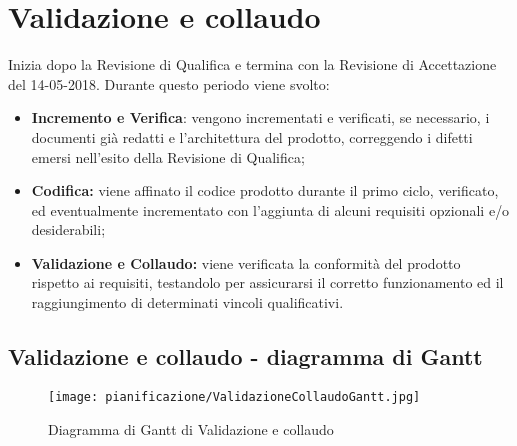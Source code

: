 \documentclass[../PianodiProgetto.tex]{subfiles}
\begin{document}
	\section{Validazione e collaudo}
	Inizia dopo la Revisione di Qualifica e termina con la Revisione di Accettazione del 14-05-2018. Durante questo periodo viene svolto:
	\begin{itemize}
		\item \textbf{Incremento e Verifica}: vengono incrementati e verificati, se necessario, i documenti già redatti e l'architettura del prodotto, correggendo i difetti emersi nell'esito della Revisione di Qualifica;
		\item \textbf{Codifica:} viene affinato il codice prodotto durante il primo ciclo, verificato, ed eventualmente incrementato con l'aggiunta di alcuni requisiti opzionali e/o desiderabili;		
		\item \textbf{Validazione e Collaudo:} viene verificata la conformità del prodotto rispetto ai requisiti, testandolo per assicurarsi il corretto funzionamento ed il raggiungimento di determinati vincoli qualificativi.
		 
	\end{itemize}
	\subsection{Validazione e collaudo - diagramma di Gantt}
	\begin{figure}[H]
		\texttt{[image: pianificazione/ValidazioneCollaudoGantt.jpg]}	
		\caption{Diagramma di Gantt di Validazione e collaudo}\label{fig:5}	
	\end{figure}
\end{document}
